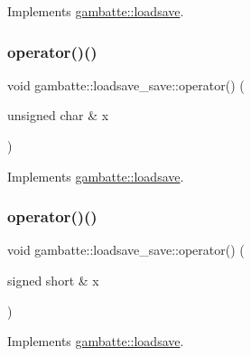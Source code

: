 Implements \hyperlink{classgambatte_1_1loadsave_abe43ebb74162f066b542781f5ec7e5af}{gambatte\+::loadsave}.

\mbox{\label{classgambatte_1_1loadsave__save_a5738bf9ee07da4c9c6af989f22e5ba29}} 
\subsubsection{\texorpdfstring{operator()()}{operator()()}\hspace{0.1cm}{\footnotesize\ttfamily [3/19]}}
{\footnotesize\ttfamily void gambatte\+::loadsave\+\_\+save\+::operator() (\begin{DoxyParamCaption}\item[{unsigned char \&}]{x }\end{DoxyParamCaption})\hspace{0.3cm}{\ttfamily [virtual]}}



Implements \hyperlink{classgambatte_1_1loadsave_a475286c3cdfc0a207cd6ac9d27bf5b0b}{gambatte\+::loadsave}.

\mbox{\label{classgambatte_1_1loadsave__save_a609ecf15fc89c056274bffa5276e9067}} 
\subsubsection{\texorpdfstring{operator()()}{operator()()}\hspace{0.1cm}{\footnotesize\ttfamily [4/19]}}
{\footnotesize\ttfamily void gambatte\+::loadsave\+\_\+save\+::operator() (\begin{DoxyParamCaption}\item[{signed short \&}]{x }\end{DoxyParamCaption})\hspace{0.3cm}{\ttfamily [virtual]}}



Implements \hyperlink{classgambatte_1_1loadsave_a8874e92f76b3765efba593c377667f16}{gambatte\+::loadsave}.

